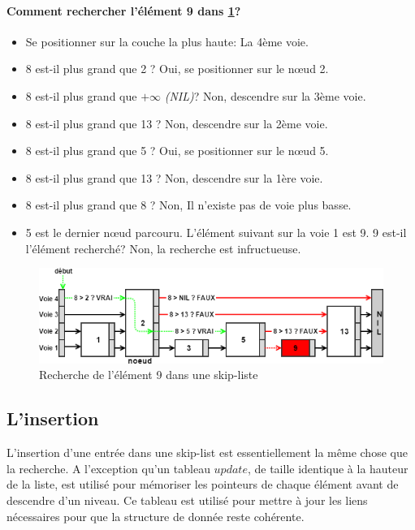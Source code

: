 \documentclass[hidelinks,a4paper, 12pt]{article}
\begin{document}
	\newpage
	\paragraph*{Comment rechercher l'élément 9 dans \cref{SkipSearch2}?}
	
	\begin{itemize}
		\item Se positionner sur la couche la plus haute: La 4ème voie.
		\item 8 est-il plus grand que 2 ? Oui, se positionner sur le nœud 2.
		\item 8 est-il plus grand que $+\infty$ \textit{(NIL)}? Non, descendre sur la 3ème voie.
		\item 8 est-il plus grand que 13  ? Non, descendre sur la 2ème voie.
		\item 8 est-il plus grand que 5 ? Oui, se positionner sur le nœud 5.
		\item 8 est-il plus grand que 13 ? Non, descendre sur la 1ère voie.
		\item 8 est-il plus grand que 8 ? Non, Il n'existe pas de voie plus basse.
		\item 5 est le dernier nœud parcouru. L'élément suivant sur la voie 1 est 9. 9 est-il l'élément recherché? Non, la recherche est infructueuse.
	\end{itemize}
	\begin{figure}[h]
		\includegraphics[width=\textwidth]{img/search2}
		\caption{Recherche de l'élément 9 dans une skip-liste}
		\label{SkipSearch2}
	\end{figure}
	
	
	\newpage
	\subsection{L'insertion}
	L'insertion d'une entrée dans une skip-list est essentiellement la même chose que la recherche. A l'exception qu'un tableau $update$, de taille identique à la hauteur de la liste, est utilisé pour mémoriser les pointeurs de chaque élément avant de descendre d'un niveau. Ce tableau est utilisé pour mettre à jour les liens nécessaires pour que la structure de donnée reste cohérente.
	
\end{document}
